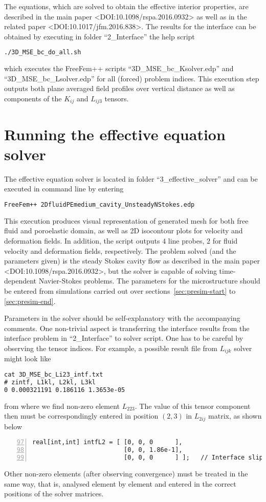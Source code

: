 \documentclass[12pt,a4paper]{article}
\begin{document}
The equations, which are solved to obtain the effective interior properties, are described in the main paper <DOI:10.1098/rspa.2016.0932> as well as in the related paper <DOI:10.1017/jfm.2016.838>. The results for the interface can be obtained by executing in folder ``2\_Interface'' the help script
\begin{lstlisting}[language=tex]
./3D_MSE_bc_do_all.sh
\end{lstlisting}
which executes the FreeFem++ scripts ``3D\_MSE\_bc\_Ksolver.edp'' and ``3D\_MSE\_bc\_Lsolver.edp'' for all (forced) problem indices. This execution step outputs both plane averaged field profiles over vertical distance as well as components of the $K_{ij}$ and $L_{ij3}$ tensors.

\section{Running the effective equation solver}

The effective equation solver is located in folder ``3\_effective\_solver'' and can be executed in command line by entering
\begin{lstlisting}[language=tex]
FreeFem++ 2DfluidPEmedium_cavity_UnsteadyNStokes.edp
\end{lstlisting}
This execution produces visual representation of generated mesh for both free fluid and poroelastic domain, as well as 2D isocontour plots for velocity and deformation fields. In addition, the script outputs $4$ line probes, $2$ for fluid velocity and deformation fields, respectively. The problem solved (and the parameters given) is the steady Stokes cavity flow as described in the main paper <DOI:10.1098/rspa.2016.0932>, but the solver is capable of solving time-dependent Navier-Stokes problems. The parameters for the microstructure should be entered from simulations carried out over sections~\ref{sec:presim-start} to \ref{sec:presim-end}.

Parameters in the solver should be self-explanatory with the accompanying comments. One non-trivial aspect is transferring the interface results from the interface problem in ``2\_Interface'' to solver script. One has to be careful by observing the tensor indices. For example, a possible result file from $L_{ijk}$ solver might look like
\begin{lstlisting}[language=tex]
cat 3D_MSE_bc_Li23_intf.txt
# zintf, L1kl, L2kl, L3kl
0 0.000321191 0.186116 1.3653e-05
\end{lstlisting}
from where we find non-zero element $L_{223}$. The value of this tensor component then must be correspondingly entered in position $(2,3)$ in $L_{2ij}$ matrix, as shown below
\begin{lstlisting}[numbers=left,firstnumber=97]
real[int,int] intfL2 = [ [0, 0, 0      ],
                         [0, 0, 1.86e-1],
                         [0, 0, 0      ] ];   // Interface slip length matrix L2kl   
\end{lstlisting}
Other non-zero elements (after observing convergence) must be treated in the same way, that is, analysed element by element and entered in the correct positions of the solver matrices.
\end{document}
